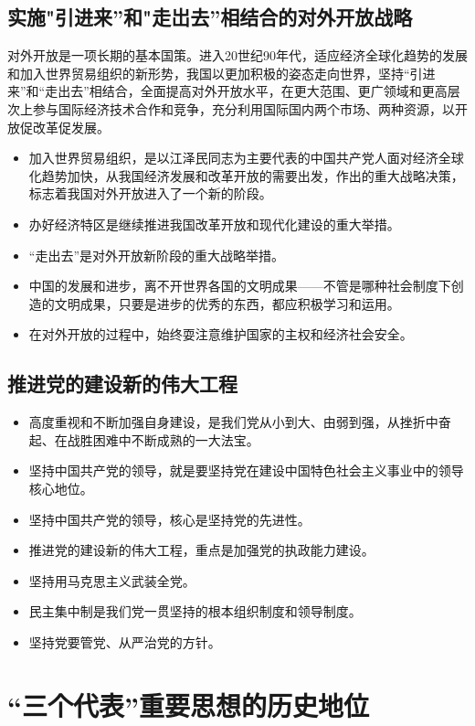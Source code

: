 \documentclass[12pt,openany]{ctexbook}
\begin{document}
\subsection{实施"引进来”和"走岀去”相结合的对外开放战略}
对外开放是一项长期的基本国策。进入20世纪90年代，适应经济全球化趋势的发展和加入世界贸易组织的新形势，我国以更加积极的姿态走向世界，坚持“引进来”和“走出去”相结合，全面提高对外开放水平，在更大范围、更广领域和更高层次上参与国际经济技术合作和竞争，充分利用国际国内两个市场、两种资源，以开放促改革促发展。
\begin{itemize}
  \item 加入世界贸易组织，是以江泽民同志为主要代表的中国共产党人面对经济全球化趋势加快，从我国经济发展和改革开放的需要出发，作出的重大战略决策，标志着我国对外开放进入了一个新的阶段。
  \item 办好经济特区是继续推进我国改革开放和现代化建设的重大举措。
  \item “走出去”是对外开放新阶段的重大战略举措。
  \item 中国的发展和进步，离不开世界各国的文明成果——不管是哪种社会制度下创造的文明成果，只要是进步的优秀的东西，都应积极学习和运用。
  \item 在对外开放的过程中，始终耍注意维护国家的主权和经济社会安全。
\end{itemize}
\subsection{推进党的建设新的伟大工程}
\begin{itemize}
  \item 高度重视和不断加强自身建设，是我们党从小到大、由弱到强，从挫折中奋起、在战胜困难中不断成熟的一大法宝。
  \item 坚持中国共产党的领导，就是要坚持党在建设中国特色社会主义事业中的领导核心地位。
  \item 坚持中国共产党的领导，核心是坚持党的先进性。
  \item 推进党的建设新的伟大工程，重点是加强党的执政能力建设。
  \item 坚持用马克思主义武装全党。
  \item 民主集中制是我们党一贯坚持的根本组织制度和领导制度。
  \item 坚持党要管党、从严治党的方针。
\end{itemize}
\section{“三个代表”重要思想的历史地位}
\end{document}
